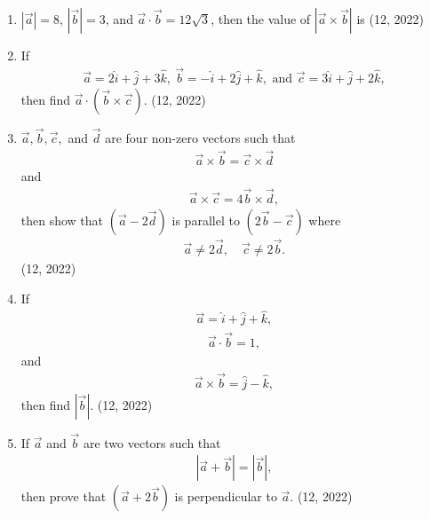 \begin{enumerate}[label=\thesubsection.\arabic*,ref=\thesubsection.\theenumi]
    \item $\left| \overrightarrow{a} \right| = 8$, $\left| \overrightarrow{b} \right| = 3$, and $\overrightarrow{a} \cdot \overrightarrow{b} = 12\sqrt{3}$, then the value of $\left| \overrightarrow{a} \times \overrightarrow{b} \right|$ is
    \hfill (12, 2022)
    \item If
    \begin{align*}
        \overrightarrow{a} = 2\hat{i} + \hat{j} + 3\hat{k},\
        \overrightarrow{b} = -\hat{i} + 2\hat{j} + \hat{k},
	    \text{ and }
        \overrightarrow{c} = 3\hat{i} + \hat{j} + 2\hat{k},
    \end{align*}
    then find $\overrightarrow{a} \cdot (\overrightarrow{b} \times \overrightarrow{c})$.
    \hfill (12, 2022)

    \item $\overrightarrow{a}, \overrightarrow{b}, \overrightarrow{c},$ and $\overrightarrow{d}$ are four non-zero vectors such that
    \begin{align*}
        \overrightarrow{a} \times \overrightarrow{b} = \overrightarrow{c} \times \overrightarrow{d}
    \end{align*}
    and
    \begin{align*}
        \overrightarrow{a} \times \overrightarrow{c} = 4\overrightarrow{b} \times \overrightarrow{d},
    \end{align*}
    then show that $(\overrightarrow{a} - 2\overrightarrow{d})$ is parallel to $(2\overrightarrow{b} - \overrightarrow{c})$ where
    \begin{align*}
        \overrightarrow{a} \neq 2\overrightarrow{d}, \quad \overrightarrow{c} \neq 2\overrightarrow{b}.
    \end{align*}
    \hfill (12, 2022)

    \item If
    \begin{align*}
        \overrightarrow{a} = \hat{i} + \hat{j} + \hat{k},
    \end{align*}
    \begin{align*}
        \overrightarrow{a} \cdot \overrightarrow{b} = 1,
    \end{align*}
    and
    \begin{align*}
        \overrightarrow{a} \times \overrightarrow{b} = \hat{j} - \hat{k},
    \end{align*}
    then find $\left| \overrightarrow{b} \right|$.
    \hfill (12, 2022)

    \item If $\overrightarrow{a}$ and $\overrightarrow{b}$ are two vectors such that
    \begin{align*}
        \left| \overrightarrow{a} + \overrightarrow{b} \right| = \left| \overrightarrow{b} \right|,
    \end{align*}
    then prove that $(\overrightarrow{a} + 2\overrightarrow{b})$ is perpendicular to $\overrightarrow{a}$.
    \hfill (12, 2022)


\end{enumerate}

